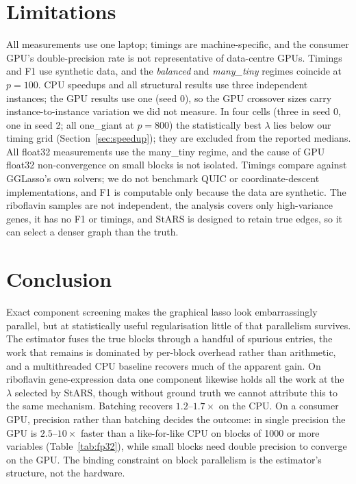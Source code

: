 \documentclass[conference]{IEEEtran}
\begin{document}
\section{Limitations}
All measurements use one laptop; timings are machine-specific, and the
consumer GPU's double-precision rate is not representative of data-centre
GPUs. Timings and F1 use synthetic data, and the \emph{balanced} and \emph{many\_tiny}
regimes coincide at $p=100$.
CPU speedups and all structural results use three
independent instances; the GPU results use one (seed 0), so the GPU crossover
sizes carry instance-to-instance variation we did not measure. In four cells (three in seed 0, one in seed 2; all one\_giant at $p=800$)
the statistically best $\lambda$ lies below our timing grid
(Section~\ref{sec:speedup}); they are excluded from the reported medians. All float32 measurements use the many\_tiny regime, and the cause of GPU
float32 non-convergence on small blocks is not isolated. Timings compare against GGLasso's own
solvers; we do not benchmark QUIC or coordinate-descent implementations, and
F1 is computable only because the data are synthetic. The riboflavin samples
are not independent, the analysis covers only high-variance genes, it has no
F1 or timings, and StARS is designed to retain true edges, so it can select a
denser graph than the truth.

\section{Conclusion}
Exact component screening makes the graphical lasso look embarrassingly
parallel, but at statistically useful regularisation little of that
parallelism survives. The estimator fuses the true blocks through a handful
of spurious entries, the work that remains is dominated by per-block overhead
rather than arithmetic, and a multithreaded CPU baseline recovers much of the
apparent gain. On riboflavin gene-expression data one component likewise holds
all the work at the $\lambda$ selected by StARS, though without ground truth we
cannot attribute this to the same mechanism. Batching recovers $1.2$--$1.7\times$ on the CPU. On a
consumer GPU, precision rather than batching decides the outcome: in single
precision the GPU is $2.5$--$10\times$ faster than a like-for-like CPU on
blocks of 1000 or more variables (Table~\ref{tab:fp32}), while small blocks need double precision to converge on the
GPU. The binding constraint on block parallelism is the
estimator's structure, not the hardware.



\end{document}

